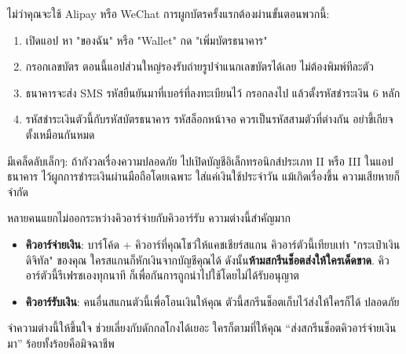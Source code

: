 


ไม่ว่าคุณจะใช้ Alipay หรือ WeChat การผูกบัตรครั้งแรกต้องผ่านขั้นตอนพวกนี้:

\begin{enumerate}
  \item เปิดแอป หา "ของฉัน" หรือ "Wallet" กด "เพิ่มบัตรธนาคาร"
  \item กรอกเลขบัตร ตอนนี้แอปส่วนใหญ่รองรับถ่ายรูปจำแนกเลขบัตรได้เลย ไม่ต้องพิมพ์ทีละตัว
  \item ธนาคารจะส่ง SMS รหัสยืนยันมาที่เบอร์ที่ลงทะเบียนไว้ กรอกลงไป แล้วตั้งรหัสชำระเงิน 6 หลัก
  \item รหัสชำระเงินตัวนี้กับรหัสบัตรธนาคาร รหัสล็อกหน้าจอ ควรเป็นรหัสสามตัวที่ต่างกัน อย่าขี้เกียจตั้งเหมือนกันหมด
\end{enumerate}

มีเคล็ดลับเล็กๆ: ถ้ากังวลเรื่องความปลอดภัย ไปเปิดบัญชีอิเล็กทรอนิกส์ประเภท II หรือ III ในแอปธนาคาร ไว้ผูกการชำระเงินผ่านมือถือโดยเฉพาะ ใส่แค่เงินใช้ประจำวัน แม้เกิดเรื่องขึ้น ความเสียหายก็จำกัด


หลายคนแยกไม่ออกระหว่างคิวอาร์จ่ายกับคิวอาร์รับ ความต่างนี้สำคัญมาก

\begin{itemize}
  \item \textbf{คิวอาร์จ่ายเงิน}: บาร์โค้ด + คิวอาร์ที่คุณโชว์ให้แคชเชียร์สแกน คิวอาร์ตัวนี้เทียบเท่า "กระเป๋าเงินดิจิทัล" ของคุณ ใครสแกนก็หักเงินจากบัญชีคุณได้ ดังนั้น\textbf{ห้ามสกรีนช็อตส่งให้ใครเด็ดขาด}. คิวอาร์ตัวนี้รีเฟรชเองทุกนาที ก็เพื่อกันการถูกนำไปใช้โดยไม่ได้รับอนุญาต
  \item \textbf{คิวอาร์รับเงิน}: คนอื่นสแกนตัวนี้เพื่อโอนเงินให้คุณ ตัวนี้สกรีนช็อตเก็บไว้ส่งให้ใครก็ได้ ปลอดภัย
\end{itemize}

จำความต่างนี้ให้ขึ้นใจ ช่วยเลี่ยงกับดักกลโกงได้เยอะ ใครก็ตามที่ให้คุณ “ส่งสกรีนช็อตคิวอาร์จ่ายเงินมา” ร้อยทั้งร้อยคือมิจฉาชีพ

